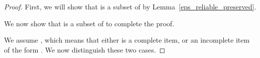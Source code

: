 \begin{isabellebody}
\begin{isamarkuptext}
\begin{lemma}
\begin{proof}
First, we will show that \isa{{\isasymE}} is a subset of  by 
Lemma~\ref{eps_reliable_preserved}.

We now show that  is a subset of \isa{{\isasymE}} to complete the proof.

We assume , which means that either
 is a complete item, or an incomplete item of the form .
We now distinguish these two cases.


\end{proof}
\end{lemma}
\end{isamarkuptext}
\end{isabellebody}
